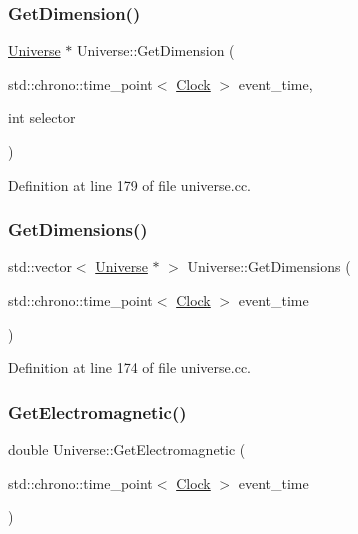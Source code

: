 \subsubsection{\texorpdfstring{Get\+Dimension()}{GetDimension()}}
{\footnotesize\ttfamily \mbox{\hyperlink{class_universe}{Universe}} $\ast$ Universe\+::\+Get\+Dimension (\begin{DoxyParamCaption}\item[{std\+::chrono\+::time\+\_\+point$<$ \mbox{\hyperlink{universe_8h_a0ef8d951d1ca5ab3cfaf7ab4c7a6fd80}{Clock}} $>$}]{event\+\_\+time,  }\item[{int}]{selector }\end{DoxyParamCaption})}



Definition at line 179 of file universe.\+cc.

\mbox{\label{class_universe_a1869fc7bf43827378bab5a701f7f917a}} 
\subsubsection{\texorpdfstring{Get\+Dimensions()}{GetDimensions()}}
{\footnotesize\ttfamily std\+::vector$<$ \mbox{\hyperlink{class_universe}{Universe}} $\ast$ $>$ Universe\+::\+Get\+Dimensions (\begin{DoxyParamCaption}\item[{std\+::chrono\+::time\+\_\+point$<$ \mbox{\hyperlink{universe_8h_a0ef8d951d1ca5ab3cfaf7ab4c7a6fd80}{Clock}} $>$}]{event\+\_\+time }\end{DoxyParamCaption})}



Definition at line 174 of file universe.\+cc.

\mbox{\label{class_universe_a63b850ef3f3394313353109d222bf5d1}} 
\subsubsection{\texorpdfstring{Get\+Electromagnetic()}{GetElectromagnetic()}}
{\footnotesize\ttfamily double Universe\+::\+Get\+Electromagnetic (\begin{DoxyParamCaption}\item[{std\+::chrono\+::time\+\_\+point$<$ \mbox{\hyperlink{universe_8h_a0ef8d951d1ca5ab3cfaf7ab4c7a6fd80}{Clock}} $>$}]{event\+\_\+time }\end{DoxyParamCaption})\hspace{0.3cm}{\ttfamily [virtual]}}



